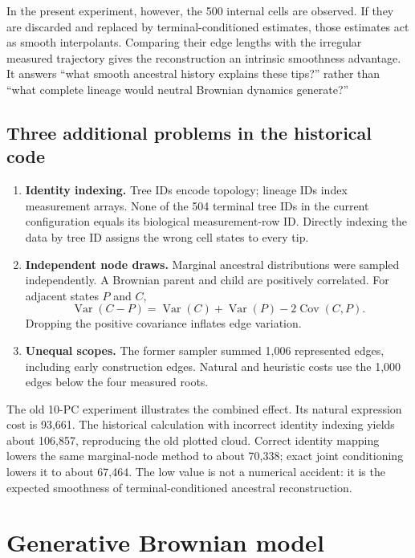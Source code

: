 \documentclass[10pt]{article}
\newcommand{\Var}{\operatorname{Var}}
\newcommand{\Cov}{\operatorname{Cov}}
\begin{document}
In the present experiment, however, the 500 internal cells are observed.  If
they are discarded and replaced by terminal-conditioned estimates, those
estimates act as smooth interpolants.  Comparing their edge lengths with the
irregular measured trajectory gives the reconstruction an intrinsic smoothness
advantage.  It answers ``what smooth ancestral history explains these tips?''
rather than ``what complete lineage would neutral Brownian dynamics generate?''

\subsection{Three additional problems in the historical code}

\begin{enumerate}
  \item \textbf{Identity indexing.} Tree IDs encode topology; lineage IDs index
        measurement arrays.  None of the 504 terminal tree IDs in the current
        configuration equals its biological measurement-row ID.  Directly
        indexing the data by tree ID assigns the wrong cell states to every tip.

  \item \textbf{Independent node draws.} Marginal ancestral distributions were
        sampled independently.  A Brownian parent and child are positively
        correlated.  For adjacent states $P$ and $C$,
        \[
          \Var(C-P)=\Var(C)+\Var(P)-2\Cov(C,P).
        \]
        Dropping the positive covariance inflates edge variation.

  \item \textbf{Unequal scopes.} The former sampler summed 1,006 represented
        edges, including early construction edges.  Natural and heuristic
        costs use the 1,000 edges below the four measured roots.
\end{enumerate}

The old 10-PC experiment illustrates the combined effect.  Its natural
expression cost is 93,661.  The historical calculation with incorrect
identity indexing yields about 106,857, reproducing the old plotted cloud.
Correct identity mapping lowers the same marginal-node method to about 70,338;
exact joint conditioning lowers it to about 67,464.  The low value is not a
numerical accident: it is the expected smoothness of terminal-conditioned
ancestral reconstruction.

\section{Generative Brownian model}
\end{document}
